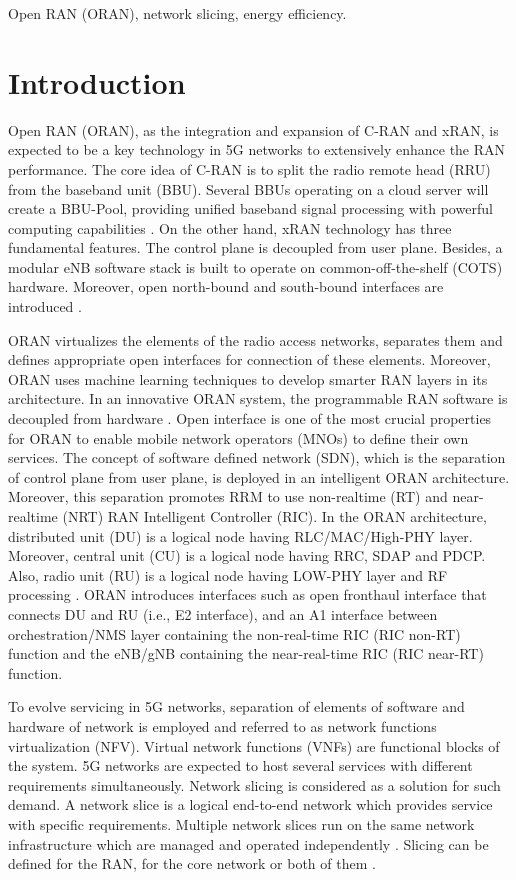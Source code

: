 \documentclass[conference]{IEEEtran}
\begin{document}
\begin{IEEEkeywords}
Open RAN (ORAN), network slicing, energy efficiency.
\end{IEEEkeywords}

\section{Introduction}
Open RAN (ORAN), as the integration and expansion of C-RAN and xRAN, is expected to be a key technology in 5G networks to extensively enhance the RAN performance. The core idea of C-RAN is to split the radio remote head (RRU) from the baseband unit (BBU). Several BBUs operating on a cloud server will create a BBU-Pool, providing unified baseband signal processing with powerful computing capabilities \cite{cran1,frdl,simeone2016cloud,motalleb2017optimal}. On the other hand, xRAN technology has three fundamental features. The control plane is decoupled from user plane. Besides, a modular eNB software stack is built to operate on common-off-the-shelf (COTS) hardware. Moreover, open north-bound and south-bound interfaces are introduced \cite{xran}.

ORAN virtualizes the elements of the radio access networks, separates them and defines appropriate open interfaces for connection of these elements. Moreover, ORAN uses machine learning techniques to develop smarter RAN layers in its architecture. In an innovative ORAN system, the programmable RAN software is decoupled from hardware \cite{oran1}. Open interface is one of the most crucial properties for ORAN to enable mobile network operators (MNOs) to define their own services.
The concept of software defined network (SDN), which is the separation of control plane from user plane, is deployed in an intelligent ORAN architecture. Moreover, this separation promotes RRM to use non-realtime (RT) and near-realtime (NRT) RAN Intelligent Controller (RIC).
In the ORAN architecture, distributed unit (DU) is a logical node having RLC/MAC/High-PHY layer.
Moreover, central unit (CU) is a logical node having RRC, SDAP and PDCP. Also, radio unit (RU) is a logical node having LOW-PHY layer and
RF processing \cite{oranpaper}.
ORAN introduces interfaces such as open fronthaul interface that connects DU and RU (i.e., E2 interface), and an A1 interface between orchestration/NMS layer containing the non-real-time RIC (RIC non-RT) function and the eNB/gNB containing the near-real-time RIC (RIC near-RT) function.

To evolve servicing in 5G networks, separation of elements of software and hardware of network is employed and referred to as network functions virtualization (NFV). Virtual network functions (VNFs) are functional blocks of the system. 5G networks are expected to host several services with different requirements simultaneously. Network slicing is considered as a solution for such demand. A network slice is a logical end-to-end network which provides service with specific requirements. Multiple network slices run on the same network infrastructure which are managed and operated independently \cite{lee2018dynamic}. Slicing can be defined for the RAN, for the core network or both of them \cite{ns1}.
\end{document}
